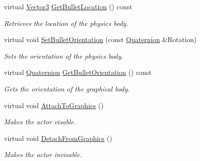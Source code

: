 \begin{DoxyCompactItemize}
virtual \hyperlink{classphys_1_1Vector3}{Vector3} \hyperlink{classphys_1_1ActorBase_a9b32df1efdc346f5d6c0920b959c09a3}{GetBulletLocation} () const 
\begin{DoxyCompactList}\small\item\em Retrieves the location of the physics body. \item\end{DoxyCompactList}\item 
virtual void \hyperlink{classphys_1_1ActorBase_a465147259c06875ca9542cf0309168eb}{SetBulletOrientation} (const \hyperlink{classphys_1_1Quaternion}{Quaternion} \&Rotation)
\begin{DoxyCompactList}\small\item\em Sets the orientation of the physics body. \item\end{DoxyCompactList}\item 
virtual \hyperlink{classphys_1_1Quaternion}{Quaternion} \hyperlink{classphys_1_1ActorBase_ab34e885196b165229b6e328137eea4e4}{GetBulletOrientation} () const 
\begin{DoxyCompactList}\small\item\em Gets the orientation of the graphical body. \item\end{DoxyCompactList}\item 
virtual void \hyperlink{classphys_1_1ActorBase_a45f190cb9b647bb3385d1298f9dab589}{AttachToGraphics} ()
\begin{DoxyCompactList}\small\item\em Makes the actor visable. \item\end{DoxyCompactList}\item 
virtual void \hyperlink{classphys_1_1ActorBase_acc352d14b6d7f15694ea108ec1c281ec}{DetachFromGraphics} ()
\begin{DoxyCompactList}\small\item\em Makes the actor invisable. \item\end{DoxyCompactList}\end{DoxyCompactItemize}

